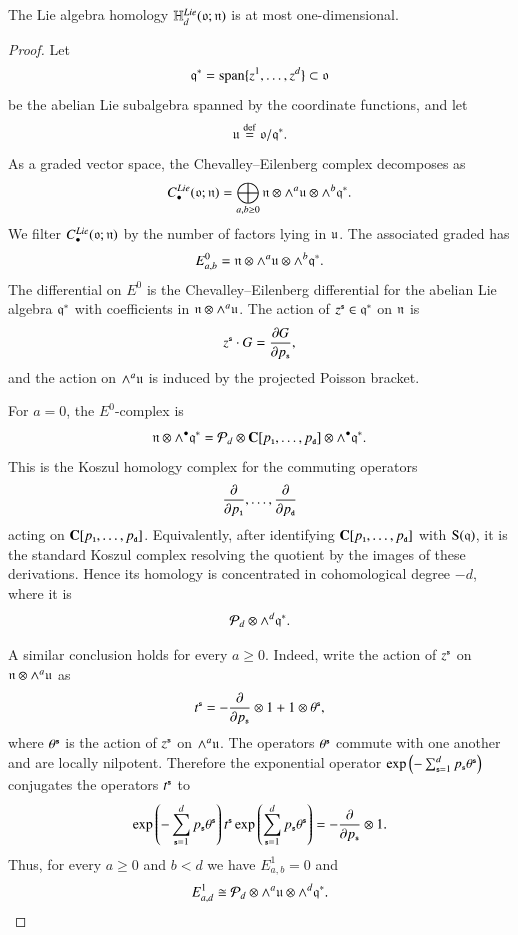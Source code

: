 \documentclass[main.tex]{subfiles}
\begin{document}
\begin{lemma}\label{lem:principal-symbol-homology}
  The Lie algebra homology $\mathbb H^{Lie}_d(\mathfrak{o};\mathfrak{n})$ is at most one-dimensional.
\end{lemma}

\begin{proof}
Let
\[
  \mathfrak{q}^*=\operatorname{span}\{z^1,\ldots,z^d\}\subset \mathfrak{o}
\]
be the abelian Lie subalgebra spanned by the coordinate functions, and let
\[
  \mathfrak{u}\overset{\rm def}{=} \mathfrak{o}/\mathfrak{q}^*.
\]
As a graded vector space, the Chevalley--Eilenberg complex decomposes as
\[
  C^{Lie}_\bullet(\mathfrak{o};\mathfrak{n})
  =
  \bigoplus_{a,b\geq 0}
  \mathfrak{n}\otimes \wedge^a \mathfrak{u}\otimes \wedge^b\mathfrak{q}^* .
\]
We filter $C^{Lie}_\bullet(\mathfrak{o};\mathfrak{n})$ by the number of factors lying in $\mathfrak{u}$. The associated graded has
\[
  E^0_{a,b}
  =
  \mathfrak{n}\otimes \wedge^a\mathfrak{u}\otimes \wedge^b\mathfrak{q}^* .
\]
The differential on $E^0$ is the Chevalley--Eilenberg differential for the abelian Lie algebra $\mathfrak{q}^*$ with
coefficients in $\mathfrak{n}\otimes \wedge^a\mathfrak{u}$. The action of $z^{\textbf{\texttt{\tiny{s}}}}\in \mathfrak{q}^*$ on $\mathfrak{n}$ is
\[
  z^{\textbf{\texttt{\tiny{s}}}}\cdot G = \frac{\partial G}{\partial p_{\textbf{\texttt{\tiny{s}}}}},
\]
and the action on $\wedge^a\mathfrak{u}$ is induced by the projected Poisson bracket.

For $a=0$, the $E^0$-complex is
\[
  \mathfrak{n}\otimes \wedge^\bullet \mathfrak{q}^*
  =
  \mathcal P_d\otimes \mathbf{C}[p_{\textbf{\texttt{\tiny{1}}}},\ldots,p_{\textbf{\texttt{\tiny{d}}}}]\otimes \wedge^\bullet \mathfrak{q}^* .
\]
This is the Koszul homology complex for the commuting operators
\[
  \frac{\partial}{\partial p_{\textbf{\texttt{\tiny{1}}}}},\ldots,\frac{\partial}{\partial p_{\textbf{\texttt{\tiny{d}}}}}
\]
acting on $\mathbf{C}[p_{\textbf{\texttt{\tiny{1}}}},\ldots,p_{\textbf{\texttt{\tiny{d}}}}]$. Equivalently, after identifying $\mathbf{C}[p_{\textbf{\texttt{\tiny{1}}}},\ldots,p_{\textbf{\texttt{\tiny{d}}}}]$ with $\operatorname{S}(\mathfrak{q})$, it is
the standard Koszul complex resolving the quotient by the images of these derivations. Hence its homology is
concentrated in cohomological degree $-d$, where it is
\[
  \mathcal P_d\otimes \wedge^d\mathfrak{q}^* .
\]

A similar conclusion holds for every $a\geq 0$. Indeed, write the action of $z^{\textbf{\texttt{\tiny{s}}}}$ on $\mathfrak{n}\otimes \wedge^a\mathfrak{u}$
as
\[
  t^{\textbf{\texttt{\tiny{s}}}}
  =
  -\frac{\partial}{\partial p_{\textbf{\texttt{\tiny{s}}}}}\otimes 1
  +
  1\otimes \theta^{\textbf{\texttt{\tiny{s}}}},
\]
where $\theta^{\textbf{\texttt{\tiny{s}}}}$ is the action of $z^{\textbf{\texttt{\tiny{s}}}}$ on $\wedge^a\mathfrak{u}$. The operators $\theta^{\textbf{\texttt{\tiny{s}}}}$ commute with one another and are locally nilpotent. 
Therefore the exponential operator $\exp\left(-\sum_{\textbf{\texttt{\tiny{s}}}=1}^d p_{\textbf{\texttt{\tiny{s}}}}\theta^{\textbf{\texttt{\tiny{s}}}}\right)$
conjugates the operators $t^{\textbf{\texttt{\tiny{s}}}}$ to
\[
  \exp\left(-\sum_{\textbf{\texttt{\tiny{s}}}=1}^d p_{\textbf{\texttt{\tiny{s}}}}\theta^{\textbf{\texttt{\tiny{s}}}}\right) t^{\textbf{\texttt{\tiny{s}}}} 
  \exp\left(\sum_{\textbf{\texttt{\tiny{s}}}=1}^d p_{\textbf{\texttt{\tiny{s}}}}\theta^{\textbf{\texttt{\tiny{s}}}}\right) = 
  -\frac{\partial}{\partial p_{\textbf{\texttt{\tiny{s}}}}}\otimes 1 .
\]
Thus, for every $a\geq 0$ and $b < d$ we have $E^1_{a,b}=0$ and
\[
  E^1_{a,d}
  \cong
  \mathcal P_d\otimes \wedge^a\mathfrak{u}\otimes \wedge^d\mathfrak{q}^* .
\]


\end{proof}
\end{document}
